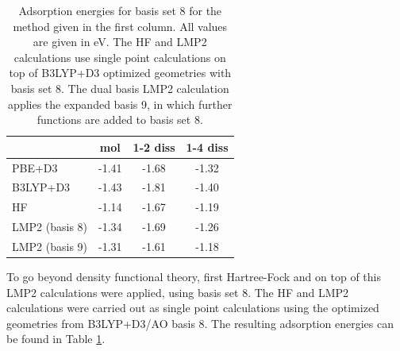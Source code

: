 \documentclass[11pt,DIV=13,BCOR=5mm,a4paper,headinclude]{scrbook}
\begin{document}
\begin{table}[!h]
  \centering
   \caption{Adsorption energies for basis set 8 for the method given in the first column.
All values are given in eV. The HF and LMP2 calculations use single point calculations on top of B3LYP+D3 optimized geometries with basis set 8.
The dual basis LMP2 calculation applies the expanded basis 9, in which further functions are added to basis set 8.}
  \begin{tabular}{l|ccc}
  \toprule
   &mol & 1-2 diss & 1-4 diss \\\midrule
PBE+D3 & -1.41 & -1.68 & -1.32 \\
B3LYP+D3 & -1.43 & -1.81 & -1.40 \\\midrule
HF &-1.14 & -1.67 & -1.19\\
LMP2 (basis 8) & -1.34 & -1.69 & -1.26\\
LMP2 (basis 9) & -1.31 & -1.61 & -1.18 \\ %
\bottomrule
  \end{tabular}
  \label{tab:combined_results}
\end{table}

% 
% 

To go beyond density functional theory, first Hartree-Fock and on top of this LMP2 calculations were applied, using basis set 8.
The HF and LMP2 calculations were carried out as single point calculations using the optimized geometries from B3LYP+D3/AO basis 8.
The resulting adsorption energies can be found in Table \ref{tab:combined_results}. %
\end{document}
